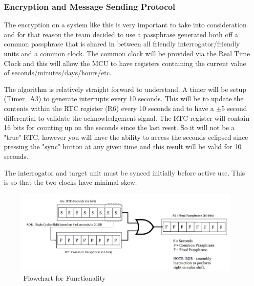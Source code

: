 \documentclass[letterpaper,10pt]{article}
\begin{document}
\begin{spacing}{1.15}
\subsubsection{Encryption and Message Sending Protocol}
The encryption on a system like this is very important to take into consideration and for that reason the team decided to use a passphrase generated both off a common passphrase that is shared in between all friendly interrogator/friendly units and a common clock. The common clock will be provided via the Real Time Clock and this will allow the MCU to have registers containing the current value of seconds/minutes/days/hours/etc. 

The algorithm is relatively straight forward to understand. A timer will be setup (Timer\_A3) to generate interrupts every 10 seconds. This will be to update the contents within the RTC register (R6) every 10 seconds and to have a $\pm$5 second differential to validate the acknowledgement signal. The RTC register will contain 16 bits for counting up on the seconds since the last reset. So it will not be a "true" RTC, however you will have the ability to access the seconds eclipsed since pressing the "sync" button at any given time and this result will be valid for 10 seconds.

The interrogator and target unit must be synced initially before active use. This is so that the two clocks have minimal skew. 
\begin{figure} [H]
	\centering
	\includegraphics[scale=0.45]{Encryption_Diagram.png}
	\caption{Flowchart for Functionality\label{fig:circuit-schematic}}
\end{figure}



\end{spacing}
\end{document}

